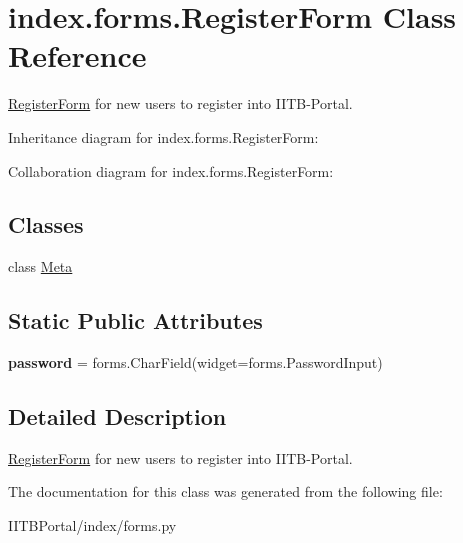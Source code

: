 \hypertarget{classindex_1_1forms_1_1RegisterForm}{}\section{index.\+forms.\+Register\+Form Class Reference}
\label{classindex_1_1forms_1_1RegisterForm}


\hyperlink{classindex_1_1forms_1_1RegisterForm}{Register\+Form} for new users to register into I\+I\+T\+B-\/\+Portal.  




Inheritance diagram for index.\+forms.\+Register\+Form\+:


Collaboration diagram for index.\+forms.\+Register\+Form\+:
\subsection*{Classes}
\begin{DoxyCompactItemize}
\item 
class \hyperlink{classindex_1_1forms_1_1RegisterForm_1_1Meta}{Meta}
\end{DoxyCompactItemize}
\subsection*{Static Public Attributes}
\begin{DoxyCompactItemize}
\item 
\mbox{\label{classindex_1_1forms_1_1RegisterForm_a11c0f772cddb3375cdebdd3dfab1b144}} 
{\bfseries password} = forms.\+Char\+Field(widget=forms.\+Password\+Input)
\end{DoxyCompactItemize}


\subsection{Detailed Description}
\hyperlink{classindex_1_1forms_1_1RegisterForm}{Register\+Form} for new users to register into I\+I\+T\+B-\/\+Portal. 



The documentation for this class was generated from the following file\+:\begin{DoxyCompactItemize}
\item 
I\+I\+T\+B\+Portal/index/forms.\+py\end{DoxyCompactItemize}
